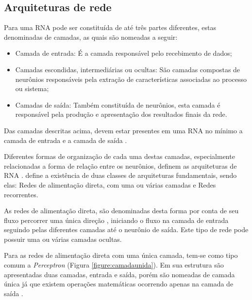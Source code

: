 \subsection{Arquiteturas de rede} 

\par Para  uma RNA pode ser constituída de até três partes diferentes, estas denominadas de camadas, as quais são nomeadas a seguir:

\begin{itemize}
    \item Camada de entrada: É a camada responsável pelo recebimento de dados;
    \item Camadas escondidas, intermediárias ou ocultas: São camadas compostas de neurônios responsáveis pela extração de características associadas ao processo ou sistema;
    \item Camadas de saída: Também constituída de neurônios, esta camada é responsável pela produção e apresentação dos resultados finais da rede.
\end{itemize}

\par Das camadas descritas acima, devem estar presentes em uma RNA no mínimo a camada de entrada e a camada de saída \cite{Cintra2019}.

\par Diferentes formas de organização de cada uma destas camadas, especialmente relacionadas a forma de relação entre os neurônios, definem as arquiteturas de RNA \cite{livroNunes2016}.  define a existência de duas classes de arquiteturas fundamentais, sendo elas: Redes de alimentação direta, com uma ou várias camadas e Redes recorrentes.

\par As redes de alimentação direta, são denominadas desta forma por conta de seu fluxo percorrer uma única direção \cite{Cintra2019}, iniciando o fluxo na camada de entrada seguindo pelas diferentes camadas até o neurônio de saída. Este tipo de rede pode possuir uma ou várias camadas ocultas.

\par Para as redes de alimentação direta com uma única camada, tem-se como tipo comum a \textit{Perceptron} (Figura \ref{figure:camadaunida}). Em sua estrutura são apresentadas duas camadas, entrada e saída, porém são nomeadas de camada única já que existem operações matemáticas ocorrendo apenas na camada de saída \cite{livroNunes2016}.

